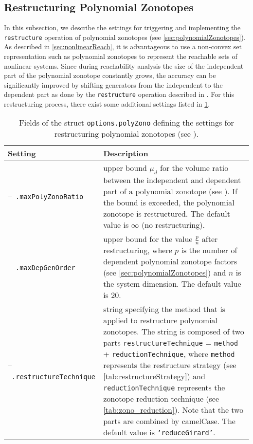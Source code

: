 \subsection{Restructuring Polynomial Zonotopes}
\label{sec:restructurepolyZonotope}

In this subsection, we describe the settings for triggering and implementing the \texttt{restructure} operation of polynomial zonotopes (see \cref{sec:polynomialZonotopes}). As described in \cref{sec:nonlinearReach}, it is advantageous to use a non-convex set representation such as polynomial zonotopes to represent the reachable sets of nonlinear systems. Since during reachability analysis the size of the independent part of the polynomial zonotope constantly grows, the accuracy can be significantly improved by shifting generators from the independent to the dependent part as done by the \texttt{restructure} operation described in \cite[Sec.~2.5]{Kochdumper2021a}. For this restructuring process, there exist some additional settings listed in \cref{tab:polyZono}.

\begin{table}
\centering
\renewcommand{\arraystretch}{1.3}
\caption{Fields of the struct \texttt{options.polyZono} defining the settings for restructuring polynomial zonotopes (see \cite[Sec.~2.5]{Kochdumper2021a}).}
\label{tab:polyZono}
\begin{tabular}{ l p{11cm} }	
\toprule
\textbf{Setting} & \textbf{Description} \\
\midrule
	--~\texttt{.maxPolyZonoRatio} & upper bound $\mu_d$ for the volume ratio between the independent and dependent part of a polynomial zonotope (see \cite[Line~18 in Alg.~1]{Kochdumper2021a}). If the bound is exceeded, the polynomial zonotope is restructured. The default value is $\infty$ (no restructuring).  \\
	--~\texttt{.maxDepGenOrder} & upper bound for the value $\frac{p}{n}$ after restructuring, where $p$ is the number of dependent polynomial zonotope factors (see \cref{sec:polynomialZonotopes}) and $n$ is the system dimension. The default value is 20. \\
	--~\texttt{.restructureTechnique} & string specifying the method that is applied to restructure polynomial zonotopes. The string is composed of two parts \texttt{restructureTechnique} = \texttt{method} + \texttt{reductionTechnique}, where \texttt{method} represents the restructure strategy (see \cref{tab:restructureStrategy}) and \texttt{reductionTechnique} represents the zonotope reduction technique (see \cref{tab:zono_reduction}). Note that the two parts are combined by camelCase. The default value is \texttt{'reduceGirard'}. \\
\bottomrule
\end{tabular}
\end{table}


